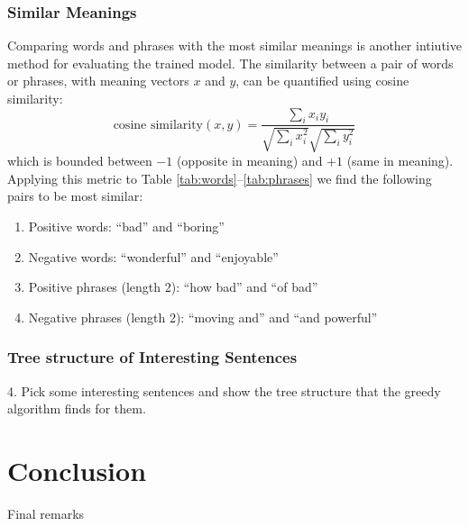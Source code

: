 \documentclass{article}
\begin{document}
\subsubsection{Similar Meanings}
Comparing words and phrases with the most similar meanings is another intiutive method for evaluating the trained model. The similarity between a pair of words or phrases, with meaning vectors $x$ and $y$, can be quantified using cosine similarity:
\begin{equation}
    \textrm{cosine similarity} (x, y) = \frac{\sum_i x_i y_i}{\sqrt{\sum_i x_i^2} \sqrt{\sum_i y_i^2}}
\end{equation}
which is bounded between $-1$ (opposite in meaning) and $+1$ (same in meaning). Applying this metric to Table \ref{tab:words}--\ref{tab:phrases} we find the following pairs to be most similar:
\begin{enumerate}
    \item Positive words: ``bad'' and ``boring''
    \item Negative words: ``wonderful'' and ``enjoyable''
    \item Positive phrases (length 2): ``how bad'' and ``of bad''
    \item Negative phrases (length 2): ``moving and'' and ``and powerful''
\end{enumerate}

\subsubsection{Tree structure of Interesting Sentences}
4. Pick some interesting sentences and show the tree structure that the greedy algorithm finds for them.






\section{Conclusion}
Final remarks




\small{


}
\end{document}
